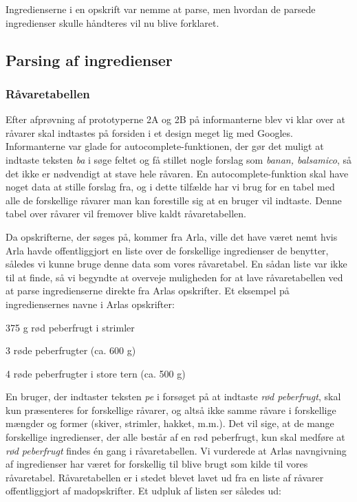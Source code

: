 Ingredienserne i en opskrift var nemme at parse, men hvordan de parsede ingredienser skulle håndteres vil nu blive forklaret.


\subsection{Parsing af ingredienser}

\subsubsection{Råvaretabellen}
\label{subsec:parsingafraavarer}
Efter afprøvning af prototyperne 2A og 2B på informanterne blev vi klar over at råvarer skal indtastes på forsiden i et design meget lig med Googles. Informanterne var glade for autocomplete-funktionen, der gør det muligt at indtaste teksten \textit{ba} i søge feltet og få stillet nogle forslag som \fx \textit{banan, balsamico}, så det ikke er nødvendigt at stave hele råvaren.
En autocomplete-funktion skal have noget data at stille forslag fra, og i dette tilfælde har vi brug for en tabel med alle de forskellige råvarer man kan forestille sig at en bruger vil indtaste. Denne tabel over råvarer vil fremover blive kaldt råvaretabellen.

Da opskrifterne, der søges på, kommer fra Arla, ville det have været nemt hvis Arla havde offentliggjort en liste over de forskellige ingredienser de benytter, således vi kunne bruge denne data som vores råvaretabel. En sådan liste var ikke til at finde, så vi begyndte at overveje muligheden for at lave råvaretabellen ved at parse ingredienserne direkte fra Arlas opskrifter. Et eksempel på ingrediensernes navne i Arlas opskrifter:

375 g rød peberfrugt i strimler

3 røde peberfrugter (ca. 600 g)

4 røde peberfrugter i store tern (ca. 500 g)

En bruger, der indtaster teksten \textit{pe} i forsøget på at indtaste \textit{rød peberfrugt}, skal kun præsenteres for forskellige råvarer, og altså ikke samme råvare i forskellige mængder og former (skiver, strimler, hakket, m.m.). Det vil sige, at de mange forskellige ingredienser, der alle består af en rød peberfrugt, kun skal medføre at \textit{rød peberfrugt} findes én gang i råvaretabellen. Vi vurderede at Arlas navngivning af ingredienser har været for forskellig til blive brugt som kilde til vores råvaretabel. Råvaretabellen er i stedet blevet lavet ud fra en liste af råvarer offentliggjort af madopskrifter. Et udpluk af listen ser således ud:

